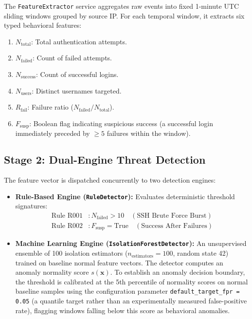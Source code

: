 \documentclass[conference]{IEEEtran}
\begin{document}
The \texttt{FeatureExtractor} service aggregates raw events into fixed 1-minute UTC sliding windows grouped by source IP. For each temporal window, it extracts six typed behavioral features:
\begin{enumerate}
    \item $N_{\text{total}}$: Total authentication attempts.
    \item $N_{\text{failed}}$: Count of failed attempts.
    \item $N_{\text{success}}$: Count of successful logins.
    \item $N_{\text{users}}$: Distinct usernames targeted.
    \item $R_{\text{fail}}$: Failure ratio ($N_{\text{failed}} / N_{\text{total}}$).
    \item $F_{\text{susp}}$: Boolean flag indicating suspicious success (a successful login immediately preceded by $\ge 5$ failures within the window).
\end{enumerate}

\subsection{Stage 2: Dual-Engine Threat Detection}
The feature vector is dispatched concurrently to two detection engines:
\begin{itemize}
    \item \textbf{Rule-Based Engine (\texttt{RuleDetector}):} Evaluates deterministic threshold signatures:
    \begin{align}
        \text{Rule R001} &: N_{\text{failed}} > 10 \quad (\text{SSH Brute Force Burst}) \\
        \text{Rule R002} &: F_{\text{susp}} = \text{True} \quad (\text{Success After Failures})
    \end{align}
    \item \textbf{Machine Learning Engine (\texttt{IsolationForestDetector}):} An unsupervised ensemble of 100 isolation estimators ($n_{\text{estimators}}=100$, random state 42) trained on baseline normal feature vectors. The detector computes an anomaly normality score $s(\mathbf{x})$. To establish an anomaly decision boundary, the threshold is calibrated at the 5th percentile of normality scores on normal baseline samples using the configuration parameter \texttt{default\_target\_fpr = 0.05} (a quantile target rather than an experimentally measured false-positive rate), flagging windows falling below this score as behavioral anomalies.
\end{itemize}
\end{document}
